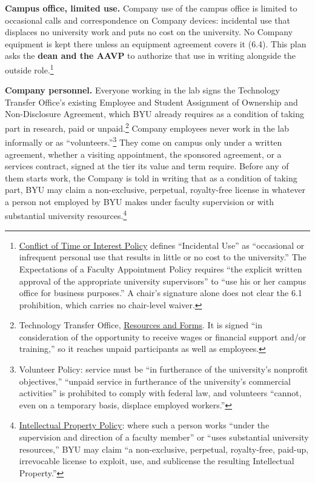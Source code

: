 \documentclass[11pt]{article}
\begin{document}
 \textbf{Campus office, limited use.} Company use of the campus
office is limited to occasional calls and correspondence on Company devices:
incidental use that displaces no university work and puts no cost on the
university. No Company equipment is kept there unless an equipment agreement
covers it (6.4). This plan asks the \textbf{dean and the AAVP} to authorize
that use in writing alongside the outside role.\footnote{\href{https://policy.byu.edu/view/conflict-of-time-or-interest-policy}{Conflict
of Time or Interest Policy} defines ``Incidental Use'' as ``occasional or
infrequent personal use that results in little or no cost to the university.'' The
Expectations of a Faculty Appointment Policy requires ``the explicit written
approval of the appropriate university supervisors'' to ``use his or her
campus office for business purposes.'' A chair's signature alone does not clear
the 6.1 prohibition, which carries no chair-level waiver.}

 \textbf{Company personnel.} Everyone working in the lab signs
the Technology Transfer Office's existing Employee and Student Assignment of
Ownership and Non-Disclosure Agreement, which BYU already requires as a
condition of taking part in research, paid or unpaid.\footnote{Technology Transfer Office,
\href{https://techtransfer.byu.edu/resources}{Resources and Forms}. It is
signed ``in consideration of the opportunity to receive wages or financial
support and/or training,'' so it reaches unpaid participants as well as
employees.} Company employees never work in the lab informally or as
``volunteers.''\footnote{Volunteer Policy: service must be ``in furtherance of
the university's nonprofit objectives,'' ``unpaid service in furtherance of
the university's commercial activities'' is prohibited to comply with federal
law, and volunteers ``cannot, even on a temporary basis, displace employed
workers.''} They come on campus only under a written agreement, whether a visiting
appointment, the sponsored agreement, or a services contract, signed at the
tier its value and term require. Before any of them starts work, the Company
is told in writing that as a condition of taking part, BYU may claim a
non-exclusive, perpetual, royalty-free license in whatever a person not
employed by BYU makes under faculty supervision or with substantial university
resources.\footnote{\href{https://policy.byu.edu/view/intellectual-property-policy}{Intellectual
Property Policy}: where such a person works ``under the supervision and
direction of a faculty member'' or ``uses substantial university resources,''
BYU may claim ``a non-exclusive, perpetual, royalty-free, paid-up, irrevocable
license to exploit, use, and sublicense the resulting Intellectual
Property.''}
\end{document}
